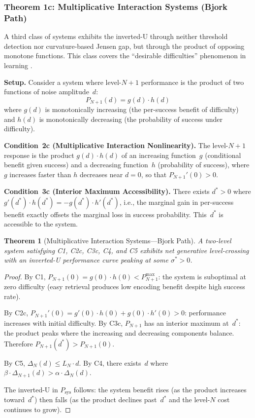 \documentclass[12pt,letterpaper]{article}
\newtheorem{theorem}{Theorem}[section]
\theoremstyle{definition}
\theoremstyle{remark}
\newcommand{\Psys}{P_{\text{sys}}}
\newcommand{\Pnp}{P_{N+1}}
\begin{document}
\subsubsection{Theorem 1c: Multiplicative Interaction Systems (Bjork Path)}

A third class of systems exhibits the inverted-U through neither threshold detection nor curvature-based Jensen gap, but through the product of opposing monotone functions. This class covers the ``desirable difficulties'' phenomenon in learning \citep{bjork1992,bjork2011}.

\textbf{Setup.} Consider a system where level-$N{+}1$ performance is the product of two functions of noise amplitude~$d$:
\begin{equation}
\Pnp(d) = g(d) \cdot h(d)
\end{equation}
where $g(d)$ is monotonically increasing (the per-success benefit of difficulty) and $h(d)$ is monotonically decreasing (the probability of success under difficulty).

\medskip
\noindent\textbf{Condition~2c (Multiplicative Interaction Nonlinearity).} The level-$N{+}1$ response is the product $g(d) \cdot h(d)$ of an increasing function~$g$ (conditional benefit given success) and a decreasing function~$h$ (probability of success), where $g$ increases faster than $h$ decreases near $d = 0$, so that $P_{N+1}'(0) > 0$.

\medskip
\noindent\textbf{Condition~3c (Interior Maximum Accessibility).} There exists $d^* > 0$ where $g'(d^*) \cdot h(d^*) = -g(d^*) \cdot h'(d^*)$, i.e., the marginal gain in per-success benefit exactly offsets the marginal loss in success probability. This~$d^*$ is accessible to the system.

\begin{theorem}[Multiplicative Interaction Systems---Bjork Path]
\label{thm:1c}
A two-level system satisfying C1, C2c, C3c, C4, and C5 exhibits net generative level-crossing with an inverted-U performance curve peaking at some $\sigma^* > 0$.
\end{theorem}

\begin{proof}
By C1, $\Pnp(0) = g(0) \cdot h(0) < P_{N+1}^{\max}$: the system is suboptimal at zero difficulty (easy retrieval produces low encoding benefit despite high success rate).

By C2c, $P_{N+1}'(0) = g'(0) \cdot h(0) + g(0) \cdot h'(0) > 0$: performance increases with initial difficulty. By C3c, $\Pnp$ has an interior maximum at~$d^*$: the product peaks where the increasing and decreasing components balance. Therefore $\Pnp(d^*) > \Pnp(0)$.

By C5, $\Delta_N(d) \leq L_N \cdot d$. By C4, there exists~$d$ where $\beta \cdot \Delta_{N+1}(d) > \alpha \cdot \Delta_N(d)$.

The inverted-U in $\Psys$ follows: the system benefit rises (as the product increases toward~$d^*$) then falls (as the product declines past~$d^*$ and the level-$N$ cost continues to grow).
\end{proof}
\end{document}
